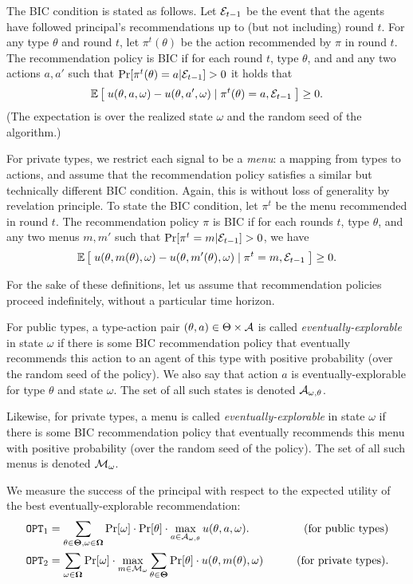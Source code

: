 The BIC condition is stated as follows. Let $\mathcal{E}_{t-1}$ be the event that the agents have followed principal's recommendations up to (but not including) round $t$. For any type $\theta$ and round $t$, let $\pi^t(\theta)$ be the action recommended by $\pi$ in round $t$. The recommendation policy is BIC if for each round $t$, type $\theta$, and and any two actions $a,a'$ such that $\Pr[\pi^t(\theta) = a|\mathcal{E}_{t-1}] > 0$ it holds that
\[
\mathbb{E}\left[\; u(\theta,a,\omega) - u(\theta,a',\omega) \mid \pi^t(\theta) =a, \mathcal{E}_{t-1}\;\right] \geq 0.
\]
(The expectation is over the realized state $\omega$ and the random seed of the algorithm.)

For private types, we restrict each signal to be a \emph{menu}: a mapping from types to actions, and assume that the recommendation policy satisfies a similar but technically different BIC condition. Again, this is without loss of generality by revelation principle. To state the BIC condition, let $\pi^t$ be the menu recommended in round $t$. The recommendation policy $\pi$ is BIC if for each rounds $t$, type $\theta$, and any two menus $m,m'$ such that
    $\Pr[\pi^t= m|\mathcal{E}_{t-1}] > 0$, we have
\[
\mathbb{E}\left[\; u(\theta,m(\theta),\omega) - u(\theta,m'(\theta),\omega)
    \mid \pi^t = m, \mathcal{E}_{t-1}\;\right] \geq 0.
\]

For the sake of these definitions, let us assume that recommendation policies proceed indefinitely, \ie without a particular time horizon.

For public types, a type-action pair $(\theta,a)\in \Theta\times \mathcal{A}$ is called \emph{eventually-explorable} in state $\omega$ if there is some BIC recommendation policy that eventually recommends this action to an agent of this type with positive probability (over the random seed of the policy). We also say that action $a$ is eventually-explorable for type $\theta$ and state $\omega$. The set of all such states is denoted $\mathcal{A}_{\omega,\theta}$.


Likewise, for private types, a menu is called \emph{eventually-explorable} in state $\omega$ if there is some BIC recommendation policy that eventually recommends this menu with positive probability (over the random seed of the policy). The set of all such menus is denoted $\mathcal{M}_{\omega}$. 

We measure the success of the principal with respect to the expected utility of the best eventually-explorable recommendation:
\begin{align*}
\mathtt{OPT}_1 &= \sum_{\theta \in \bold{\Theta}, \omega\in \bold{\Omega}} \Pr[\omega] \cdot \Pr[\theta] \cdot \max_{a \in \mathcal{A}_{\omega,\theta}} u(\theta, a, \omega).
    &\qquad\text{(for public types)}\\
\mathtt{OPT}_2 &= \sum_{\omega\in \bold{\Omega}} \Pr[\omega] \cdot\max_{m \in \mathcal{M}_{\omega}}\sum_{\theta \in \bold{\Theta}} \Pr[\theta] \cdot  u(\theta, m(\theta), \omega)
&\qquad\text{(for private types)}.
\end{align*}


